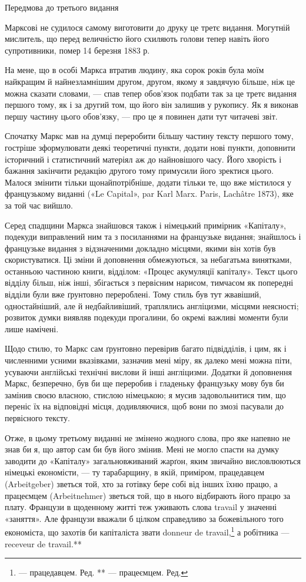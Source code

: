 Передмова до третього видання

Марксові не судилося самому виготовити до друку це третє
видання. Могутній мислитель, що перед величністю його схиляють
голови тепер навіть його супротивники, помер 14 березня 1883 р.

На мене, що в особі Маркса втратив людину, яка сорок років
була моїм найкращим й найнезламнішим другом, другом, якому
я завдячую більше, ніж це можна сказати словами, — спав
тепер обов’язок подбати так за це третє видання першого тому,
як і за другий том, що його він залишив у рукопису. Як я виконав
першу частину цього обов’язку, — про це я повинен дати тут
читачеві звіт.

Спочатку Маркс мав на думці переробити більшу частину
тексту першого тому, гостріше зформулювати деякі теоретичні
пункти, додати нові пункти, доповнити історичний і статистичний
матеріял аж до найновішого часу. Його хворість і бажання
закінчити редакцію другого тому примусили його зректися цього.
Малося змінити тільки щонайпотрібніше, додати тільки те, що
вже містилося у французькому виданні («Le Capital», par Karl
Marx. Paris, Lachâtre 1873), яке за той час вийшло.

Серед спадщини Маркса знайшовся також і німецький примірник
«Капіталу», подекуди виправлений ним та з посиланнями
на французьке видання; знайшлось і французьке видання з
відзначеними докладно місцями, якими він хотів був скористуватися.
Ці зміни й доповнення обмежуються, за небагатьма винятками,
останньою частиною книги, відділом: «Процес акумуляції
капіталу». Текст цього відділу більш, ніж інші, збігається з первісним
нарисом, тимчасом як попередні відділи були вже ґрунтовно
перероблені. Тому стиль був тут жвавіший, одностайніший,
але й недбайливіший, траплялись англіцизми, місцями неясності;
розвиток думки виявляв подекуди прогалини, бо окремі важливі
моменти були лише намічені.

Щодо стилю, то Маркс сам ґрунтовно перевірив багато підвідділів,
і цим, як і численними усними вказівками, зазначив мені
міру, як далеко мені можна піти, усуваючи англійські технічні
вислови й інші англіцизми. Додатки й доповнення Маркс, безперечно,
був би ще переробив і гладеньку французьку мову був би
замінив своєю власною, стислою німецькою; я мусив задовольнитися
тим, що переніс їх на відповідні місця, додивляючися, щоб
вони по змозі пасували до первісного тексту.

Отже, в цьому третьому виданні не змінено жодного слова,
про яке напевно не знав би я, що автор сам би був його змінив.
Мені не могло спасти на думку заводити до «Капіталу» загальновживаний
жарґон, яким звичайно висловлюються німецькі економісти,
— ту тарабарщину, в якій, приміром, працедавцем (Arbeitgeber)
зветься той, хто за готівку бере собі від інших їхню
працю, а працеємцем (Arbeitnehmer) зветься той, що в нього відбирають
його працю за плату. Французи в щоденному житті теж
уживають слова travail у значенні «заняття». Але французи
вважали б цілком справедливо за божевільного того економіста,
що захотів би капіталіста звати donneur de travail,\footnote*{
— працедавцем. Ред.
** — працеємцем. Ред.
} а робітника —
receveur de travail.**

